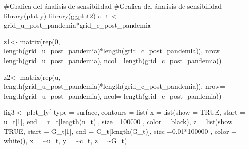 \documentclass[
  us-letterpaper,
]{scrreprt}
\newenvironment{Shaded}{\begin{snugshade}}{\end{snugshade}}
\newcommand{\AttributeTok}[1]{\textcolor[rgb]{0.40,0.45,0.13}{#1}}
\newcommand{\CommentTok}[1]{\textcolor[rgb]{0.37,0.37,0.37}{#1}}
\newcommand{\ConstantTok}[1]{\textcolor[rgb]{0.56,0.35,0.01}{#1}}
\newcommand{\DecValTok}[1]{\textcolor[rgb]{0.68,0.00,0.00}{#1}}
\newcommand{\FloatTok}[1]{\textcolor[rgb]{0.68,0.00,0.00}{#1}}
\newcommand{\FunctionTok}[1]{\textcolor[rgb]{0.28,0.35,0.67}{#1}}
\newcommand{\NormalTok}[1]{\textcolor[rgb]{0.00,0.23,0.31}{#1}}
\newcommand{\OtherTok}[1]{\textcolor[rgb]{0.00,0.23,0.31}{#1}}
\newcommand{\SpecialCharTok}[1]{\textcolor[rgb]{0.37,0.37,0.37}{#1}}
\newcommand{\StringTok}[1]{\textcolor[rgb]{0.13,0.47,0.30}{#1}}
\theoremstyle{plain}
\theoremstyle{plain}
\theoremstyle{definition}
\theoremstyle{remark}
\begin{document}
\begin{Shaded}
\begin{Highlighting}[]
\CommentTok{\#Grafica del ánalisis de sensibilidad}
\CommentTok{\#Grafica del ánalisis de sensibilidad}
\FunctionTok{library}\NormalTok{(plotly)}
\FunctionTok{library}\NormalTok{(ggplot2)}
\NormalTok{c\_t }\OtherTok{\textless{}{-}}\NormalTok{ grid\_u\_post\_pandemia}\SpecialCharTok{*}\NormalTok{grid\_c\_post\_pandemia}

\NormalTok{z1}\OtherTok{\textless{}{-}} \FunctionTok{matrix}\NormalTok{(}\FunctionTok{rep}\NormalTok{(}\DecValTok{0}\NormalTok{,}
\FunctionTok{length}\NormalTok{(grid\_u\_post\_pandemia)}\SpecialCharTok{*}\FunctionTok{length}\NormalTok{(grid\_c\_post\_pandemia)), }\AttributeTok{nrow=}
\FunctionTok{length}\NormalTok{(grid\_u\_post\_pandemia), }\AttributeTok{ncol=} \FunctionTok{length}\NormalTok{(grid\_c\_post\_pandemia))}

\NormalTok{z2}\OtherTok{\textless{}{-}} \FunctionTok{matrix}\NormalTok{(}\FunctionTok{rep}\NormalTok{(u,}
\FunctionTok{length}\NormalTok{(grid\_u\_post\_pandemia)}\SpecialCharTok{*}\FunctionTok{length}\NormalTok{(grid\_c\_post\_pandemia)), }\AttributeTok{nrow=}
\FunctionTok{length}\NormalTok{(grid\_u\_post\_pandemia), }\AttributeTok{ncol=} \FunctionTok{length}\NormalTok{(grid\_c\_post\_pandemia))}

\NormalTok{fig3 }\OtherTok{\textless{}{-}} \FunctionTok{plot\_ly}\NormalTok{(}
  \AttributeTok{type =} \StringTok{\textquotesingle{}surface\textquotesingle{}}\NormalTok{,}
  \AttributeTok{contours =} \FunctionTok{list}\NormalTok{(}
    \AttributeTok{x =} \FunctionTok{list}\NormalTok{(}\AttributeTok{show =} \ConstantTok{TRUE}\NormalTok{, }\AttributeTok{start =}\NormalTok{ u\_t[}\DecValTok{1}\NormalTok{], }\AttributeTok{end =}
\NormalTok{u\_t[}\FunctionTok{length}\NormalTok{(u\_t)], }\AttributeTok{size =}\DecValTok{100000}\NormalTok{ ,}
\AttributeTok{color =} \StringTok{\textquotesingle{}black\textquotesingle{}}\NormalTok{),}
    \AttributeTok{z =} \FunctionTok{list}\NormalTok{(}\AttributeTok{show =} \ConstantTok{TRUE}\NormalTok{, }\AttributeTok{start =}\NormalTok{ G\_t[}\DecValTok{1}\NormalTok{], }
             \AttributeTok{end =}\NormalTok{ G\_t[}\FunctionTok{length}\NormalTok{(G\_t)], }\AttributeTok{size =}\FloatTok{0.01}\SpecialCharTok{*}\DecValTok{100000}\NormalTok{ , }
             \AttributeTok{color =} \StringTok{\textquotesingle{}white\textquotesingle{}}\NormalTok{)),}
  \AttributeTok{x =} \SpecialCharTok{\textasciitilde{}}\NormalTok{u\_t,}
  \AttributeTok{y =} \SpecialCharTok{\textasciitilde{}}\NormalTok{c\_t,}
  \AttributeTok{z =} \SpecialCharTok{\textasciitilde{}}\NormalTok{G\_t)}


\end{Highlighting}
\end{Shaded}
\end{document}

